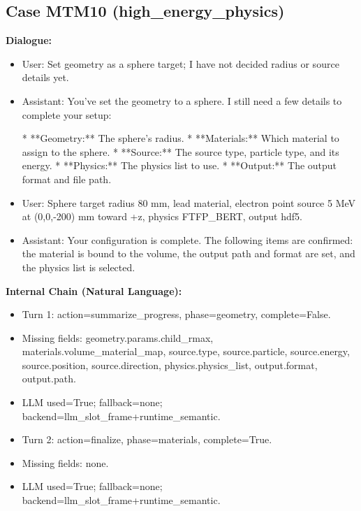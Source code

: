 \documentclass[11pt]{ctexart}
\begin{document}
\subsection{Case MTM10 (high\_energy\_physics)}
\textbf{Dialogue:}
\begin{itemize}
\item User: Set geometry as a sphere target; I have not decided radius or source details yet.
\item Assistant: You've set the geometry to a sphere. I still need a few details to complete your setup:

*   **Geometry:** The sphere's radius.
*   **Materials:** Which material to assign to the sphere.
*   **Source:** The source type, particle type, and its energy.
*   **Physics:** The physics list to use.
*   **Output:** The output format and file path.
\item User: Sphere target radius 80 mm, lead material, electron point source 5 MeV at (0,0,-200) mm toward +z, physics FTFP\_BERT, output hdf5.
\item Assistant: Your configuration is complete. The following items are confirmed: the material is bound to the volume, the output path and format are set, and the physics list is selected.
\end{itemize}
\textbf{Internal Chain (Natural Language):}
\begin{itemize}
\item Turn 1: action=summarize\_progress, phase=geometry, complete=False.
\item Missing fields: geometry.params.child\_rmax, materials.volume\_material\_map, source.type, source.particle, source.energy, source.position, source.direction, physics.physics\_list, output.format, output.path.
\item LLM used=True; fallback=none; backend=llm\_slot\_frame+runtime\_semantic.
\item Turn 2: action=finalize, phase=materials, complete=True.
\item Missing fields: none.
\item LLM used=True; fallback=none; backend=llm\_slot\_frame+runtime\_semantic.
\end{itemize}
\end{document}
